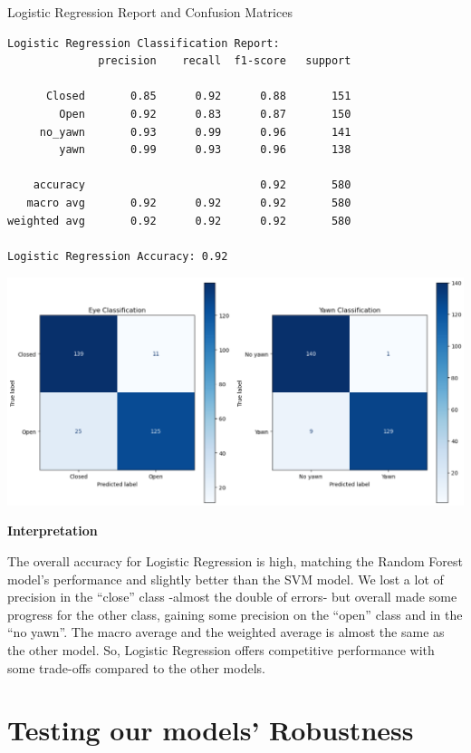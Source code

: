 \documentclass{modeleRapport}
\begin{document}
\begin{codebox}[OutputE]{ Logistic Regression Report and Confusion Matrices}
\begin{lstlisting}
Logistic Regression Classification Report:
              precision    recall  f1-score   support

      Closed       0.85      0.92      0.88       151
        Open       0.92      0.83      0.87       150
     no_yawn       0.93      0.99      0.96       141
        yawn       0.99      0.93      0.96       138

    accuracy                           0.92       580
   macro avg       0.92      0.92      0.92       580
weighted avg       0.92      0.92      0.92       580

Logistic Regression Accuracy: 0.92
\end{lstlisting}

\includegraphics[width=14cm]{Images/LR_cm.png}

\end{codebox}

\textbf{Interpretation\\}

The overall accuracy for Logistic Regression is high, matching the Random Forest model's performance and slightly better than the SVM model. We lost a lot of precision in the “close” class -almost the double of errors- but overall made some progress for the other class, gaining some precision on the “open” class and in the “no yawn”. The macro average and the weighted average is almost the same as the other model.
So, Logistic Regression offers competitive performance with some trade-offs compared to the other models.

\newpage

\section{Testing our models' Robustness}
\end{document}
